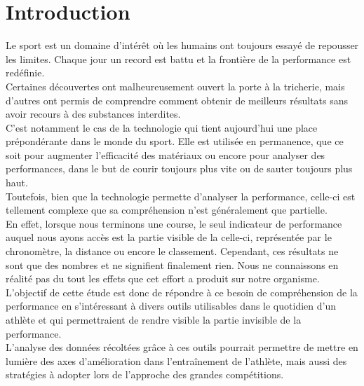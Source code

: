 \chapter*{Introduction}
\label{chap:introduction}

Le sport est un domaine d'intérêt où les humains ont toujours essayé de repousser les limites. Chaque jour un record est battu et la frontière de la performance est redéfinie. \\

Certaines découvertes ont malheureusement ouvert la porte à la tricherie, mais d’autres ont permis de comprendre comment obtenir de meilleurs résultats sans avoir recours à des substances interdites.\\

C'est notamment le cas de la technologie qui tient aujourd'hui une place prépondérante dans le monde du sport. Elle est utilisée en permanence, que ce soit pour augmenter l'efficacité des matériaux ou encore pour analyser des performances, dans le but de courir toujours plus vite ou de sauter toujours plus haut.\\

Toutefois, bien que la technologie permette d'analyser la performance, celle-ci est tellement complexe que sa compréhension n'est généralement que partielle.\\

En effet, lorsque nous terminons une course, le seul indicateur de performance auquel nous ayons accès est la partie visible de la celle-ci, représentée par le chronomètre, la distance ou encore le classement. Cependant, ces résultats ne sont que des nombres et ne signifient finalement rien. Nous ne connaissons en réalité pas du tout les effets que cet effort a produit sur notre organisme. \\

L'objectif de cette étude est donc de répondre à ce besoin de compréhension de la performance en s'intéressant à divers outils utilisables dans le quotidien d'un athlète et qui permettraient de rendre visible la partie invisible de la performance.\\

L'analyse des données récoltées grâce à ces outils pourrait permettre de mettre en lumière des axes d'amélioration dans l'entraînement de l'athlète, mais aussi des stratégies à adopter lors de l’approche des grandes compétitions.\\

